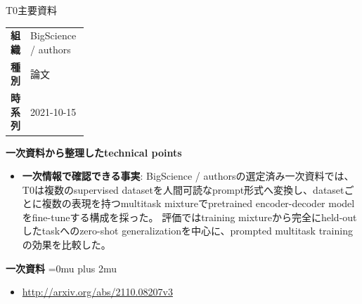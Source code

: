 \begin{technicalnote}{T0}{主要資料}
\begingroup
\begin{tabularx}{\linewidth}{@{}>{\bfseries}p{0.22\linewidth}X@{}}
組織 & BigScience / authors \\
種別 & 論文 \\
時系列 & 2021-10-15 \\
\end{tabularx}
\smallskip
\begin{minipage}{\linewidth}
{\bfseries 一次資料から整理したtechnical points}
\begin{itemize}[leftmargin=1.5em,itemsep=0.35em]
\item \textbf{一次情報で確認できる事実}: BigScience / authorsの選定済み一次資料では、T0は複数のsupervised datasetを人間可読なprompt形式へ変換し、datasetごとに複数の表現を持つmultitask mixtureでpretrained encoder-decoder modelをfine-tuneする構成を採った。 評価ではtraining mixtureから完全にheld-outしたtaskへのzero-shot generalizationを中心に、prompted multitask trainingの効果を比較した。
\end{itemize}
\begin{minipage}{\linewidth}
\begin{samepage}
{\bfseries 一次資料}
\begingroup\sloppy
\Urlmuskip=0mu plus 2mu\relax
\begin{itemize}[leftmargin=1.5em,itemsep=0.25em]
\item {\scriptsize\url{http://arxiv.org/abs/2110.08207v3}}
\end{itemize}
\endgroup
\end{samepage}
\end{minipage}
\end{minipage}
\endgroup
\end{technicalnote}
\medskip

